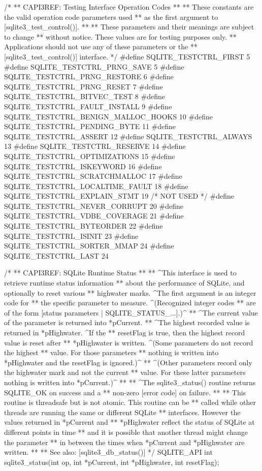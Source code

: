\begin{Codex}[label=sqlite3.h,numbers=left]
{/*
** CAPI3REF: Testing Interface Operation Codes
**
** These constants are the valid operation code parameters used
** as the first argument to [sqlite3_test_control()].
**
** These parameters and their meanings are subject to change
** without notice.  These values are for testing purposes only.
** Applications should not use any of these parameters or the
** [sqlite3_test_control()] interface.
*/
#define SQLITE_TESTCTRL_FIRST                    5
#define SQLITE_TESTCTRL_PRNG_SAVE                5
#define SQLITE_TESTCTRL_PRNG_RESTORE             6
#define SQLITE_TESTCTRL_PRNG_RESET               7
#define SQLITE_TESTCTRL_BITVEC_TEST              8
#define SQLITE_TESTCTRL_FAULT_INSTALL            9
#define SQLITE_TESTCTRL_BENIGN_MALLOC_HOOKS     10
#define SQLITE_TESTCTRL_PENDING_BYTE            11
#define SQLITE_TESTCTRL_ASSERT                  12
#define SQLITE_TESTCTRL_ALWAYS                  13
#define SQLITE_TESTCTRL_RESERVE                 14
#define SQLITE_TESTCTRL_OPTIMIZATIONS           15
#define SQLITE_TESTCTRL_ISKEYWORD               16
#define SQLITE_TESTCTRL_SCRATCHMALLOC           17
#define SQLITE_TESTCTRL_LOCALTIME_FAULT         18
#define SQLITE_TESTCTRL_EXPLAIN_STMT            19  /* NOT USED */
#define SQLITE_TESTCTRL_NEVER_CORRUPT           20
#define SQLITE_TESTCTRL_VDBE_COVERAGE           21
#define SQLITE_TESTCTRL_BYTEORDER               22
#define SQLITE_TESTCTRL_ISINIT                  23
#define SQLITE_TESTCTRL_SORTER_MMAP             24
#define SQLITE_TESTCTRL_LAST                    24

/*
** CAPI3REF: SQLite Runtime Status
**
** ^This interface is used to retrieve runtime status information
** about the performance of SQLite, and optionally to reset various
** highwater marks.  ^The first argument is an integer code for
** the specific parameter to measure.  ^(Recognized integer codes
** are of the form [status parameters | SQLITE_STATUS_...].)^
** ^The current value of the parameter is returned into *pCurrent.
** ^The highest recorded value is returned in *pHighwater.  ^If the
** resetFlag is true, then the highest record value is reset after
** *pHighwater is written.  ^(Some parameters do not record the highest
** value.  For those parameters
** nothing is written into *pHighwater and the resetFlag is ignored.)^
** ^(Other parameters record only the highwater mark and not the current
** value.  For these latter parameters nothing is written into *pCurrent.)^
**
** ^The sqlite3_status() routine returns SQLITE_OK on success and a
** non-zero [error code] on failure.
**
** This routine is threadsafe but is not atomic.  This routine can be
** called while other threads are running the same or different SQLite
** interfaces.  However the values returned in *pCurrent and
** *pHighwater reflect the status of SQLite at different points in time
** and it is possible that another thread might change the parameter
** in between the times when *pCurrent and *pHighwater are written.
**
** See also: [sqlite3_db_status()]
*/
SQLITE_API int sqlite3_status(int op, int *pCurrent, int *pHighwater, int resetFlag);


}
\end{Codex}
